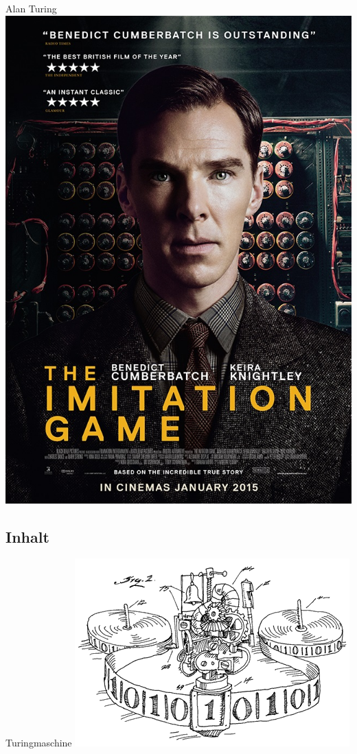 \begin{frame}{Alan Turing}
	\centering
	\vspace{-25pt}
	\includegraphics[scale=0.35]{turing/imitationGame}
\end{frame}

\subsection{Inhalt}
\begin{frame}{Turingmaschine}
	\includegraphics[scale=1]{turing/tmAufbau}
\end{frame}


